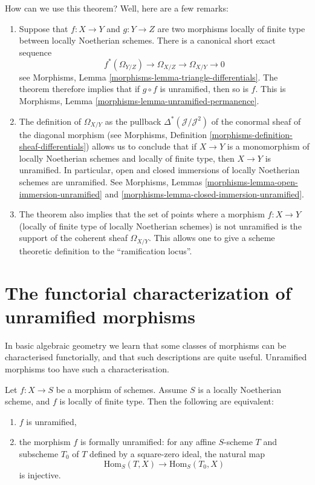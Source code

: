 \noindent
How can we use this theorem? Well, here are a few remarks:
\begin{enumerate}
\item Suppose that
$f : X \to Y$ and $g : Y \to Z$ are two morphisms locally of finite
type between locally Noetherian schemes. There is a canonical short
exact sequence
$$
f^*(\Omega_{Y/Z}) \to \Omega_{X/Z} \to \Omega_{X/Y} \to 0
$$
see Morphisms, Lemma \ref{morphisms-lemma-triangle-differentials}.
The theorem therefore implies that if $g \circ f$ is unramified,
then so is $f$. This is
Morphisms, Lemma \ref{morphisms-lemma-unramified-permanence}.
\item The definition of $\Omega_{X/Y}$ as the pullback
$\Delta^*(\mathcal{J}/\mathcal{J}^2)$ of the conormal sheaf
of the diagonal morphism (see
Morphisms, Definition \ref{morphisms-definition-sheaf-differentials})
allows us to conclude that if $X \to Y$ is a monomorphism of
locally Noetherian schemes and locally of finite type,
then $X \to Y$ is unramified.
In particular, open and closed immersions of locally Noetherian schemes
are unramified. See
Morphisms, Lemmas \ref{morphisms-lemma-open-immersion-unramified}
and
\ref{morphisms-lemma-closed-immersion-unramified}.
\item The theorem also implies that the set of points
where a morphism $f : X \to Y$ (locally of finite type of locally Noetherian
schemes) is not unramified is
the support of the coherent sheaf $\Omega_{X/Y}$.
This allows one to give a scheme theoretic definition to the
``ramification locus''.
\end{enumerate}

\section{The functorial characterization of unramified morphisms}
\label{section-functorial-unramified}

\noindent
In basic algebraic geometry we learn that some classes of morphisms can be
characterised functorially, and that such descriptions are quite useful.
Unramified morphisms too have such a characterisation.

\begin{theorem}
\label{theorem-formally-unramified}
Let $f : X \to S$ be a morphism of schemes.
Assume $S$ is a locally Noetherian scheme, and $f$ is locally of finite type.
Then the following are equivalent:
\begin{enumerate}
\item $f$ is unramified,
\item the morphism $f$ is formally unramified:
for any affine $S$-scheme $T$ and subscheme $T_0$ of $T$
defined by a square-zero ideal,
the natural map
$$
\text{Hom}_S(T, X) \longrightarrow \text{Hom}_S(T_0, X)
$$
is injective.
\end{enumerate}
\end{theorem}

